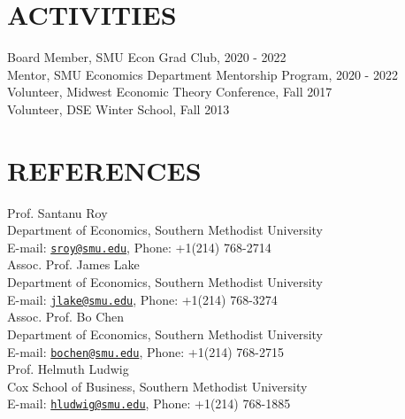 \documentclass[11pt]{res}
\begin{document}
\begin{resume}
\section{ACTIVITIES}\vspace{2mm}
Board Member, SMU Econ Grad Club, 2020 - 2022\vspace{1.5mm}\\
Mentor, SMU Economics Department Mentorship Program, 2020 - 2022\vspace{1.5mm}\\
Volunteer, Midwest Economic Theory Conference, Fall 2017\vspace{1.5mm}\\
Volunteer, DSE Winter School, Fall 2013

\section{REFERENCES}\vspace{2mm}
Prof. Santanu Roy\\
Department of Economics, Southern Methodist University\\
E-mail: \href{mailto:sroy@smu.edu}{\texttt{sroy@smu.edu}}, Phone: +1(214) 768-2714\\

\vspace{-5 mm} Assoc. Prof. James Lake\\
Department of Economics, Southern Methodist University\\
E-mail: \href{mailto:jlake@smu.edu}{\texttt{jlake@smu.edu}}, Phone: +1(214) 768-3274\\

\vspace{-5 mm} Assoc. Prof. Bo Chen\\
Department of Economics, Southern Methodist University\\
E-mail: \href{mailto:bochen@smu.edu}{\texttt{bochen@smu.edu}}, Phone: +1(214) 768-2715\\

\vspace{-5 mm} Prof. Helmuth Ludwig\\
Cox School of Business, Southern Methodist University\\
E-mail: \href{mailto:hludwig@smu.edu}{\texttt{hludwig@smu.edu}}, Phone: +1(214) 768-1885\\






\end{resume}
\end{document}
